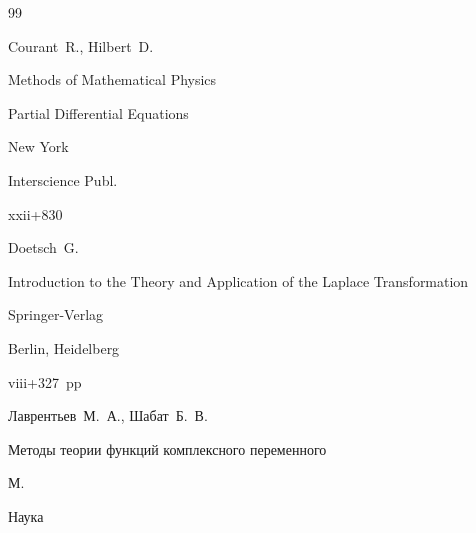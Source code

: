 





\vspace{-3mm}



\begin{thebibliography}{99}




\by Courant~R., Hilbert~D.

\book Methods of Mathematical Physics


\volinfo Partial Differential Equations

\publaddr New York

\publ Interscience Publ.


\totalpages xxii+830




\by Doetsch~G.

\book Introduction to the Theory and Application of the Laplace Transformation

\publ Springer-Verlag 

\publaddr Berlin, Heidelberg


\totalpages viii+327~pp \nofrills





\by Лаврентьев~М.~А., Шабат~Б.~В.

\book Методы теории функций комплексного переменного

\publaddr М.

\publ Наука








\end{thebibliography}
